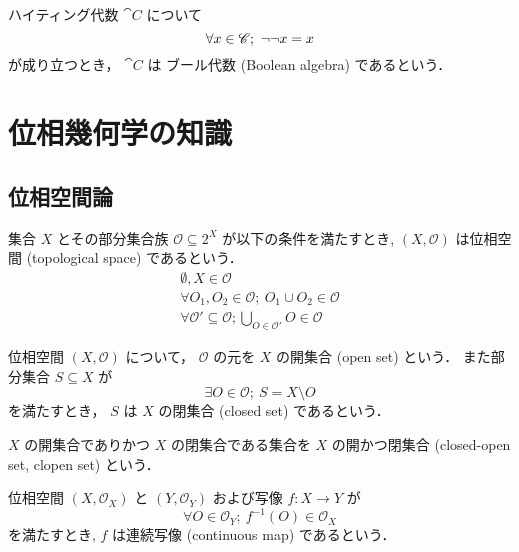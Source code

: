 \documentclass[titlepage]{ltjsreport}
\begin{document}
\begin{definition}[ブール代数]\label{def:boolean-algebra}
  ハイティング代数 $\cat{C}$ について
  \begin{equation}
    \forall x\in\objs{\cat{C}};\ \neg\neg x=x
  \end{equation}
  が成り立つとき，
  $\cat{C}$ は ブール代数 (Boolean algebra) であるという．
\end{definition}

\chapter{位相幾何学の知識}

\section{位相空間論}

\begin{definition}[位相空間]\label{def:topological-space}
  集合 $X$ とその部分集合族 $\mathcal{O}\subseteq2^X$ が以下の条件を満たすとき,
  $(X,\mathcal{O})$ は位相空間 (topological space) であるという．
  \begin{align}
    \emptyset,X\in\mathcal{O}                                 \\
    \forall O_1,O_2\in\mathcal{O};\ O_1\cup O_2\in\mathcal{O} \\
    \forall \mathcal{O}'\subseteq\mathcal{O};
    \bigcup_{O\in\mathcal{O}'}O\in\mathcal{O}
  \end{align}
\end{definition}

\begin{definition}
  位相空間 $(X,\mathcal{O})$ について，
  $\mathcal{O}$ の元を $X$ の開集合 (open set) という．
  また部分集合 $S\subseteq X$ が
  \begin{equation}
    \exists O\in\mathcal{O};\ S=X\setminus O
  \end{equation}
  を満たすとき，
  $S$ は $X$ の閉集合 (closed set) であるという．

  $X$ の開集合でありかつ $X$ の閉集合である集合を
  $X$ の開かつ閉集合 (closed-open set, clopen set) という．
\end{definition}

\begin{definition}[連続写像]\label{def:continuous-map}
  位相空間 $(X,\mathcal{O}_X)$ と $(Y,\mathcal{O}_Y)$ および写像 $f:X\to Y$ が
  \begin{equation}
    \forall O\in\mathcal{O}_Y;\ f^{-1}(O)\in\mathcal{O}_X
  \end{equation}
  を満たすとき,
  $f$ は連続写像 (continuous map) であるという．
\end{definition}
\end{document}
